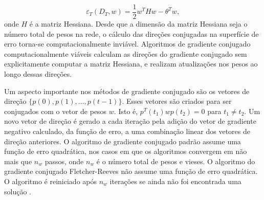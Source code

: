 \begin{equation}
\label{eq:scg1}
\varepsilon_T(D_T,w) = \frac{1}{2}w^THw - \theta^Tw,
\end{equation}
onde $H$ é a matriz Hessiana. Desde que a dimensão da matriz Hessiana seja o número total de pesos na rede, o cálculo das direções conjugadas na superfície de erro torna-se computacionalmente inviável. Algoritmos de gradiente conjugado computacionalmente viáveis calculam as direções do gradiente conjugado sem explicitamente computar a matriz Hessiana, e realizam atualizações nos pesos ao longo dessas direções.

Um aspecto importante nos métodos de gradiente conjugado são os vetores de direção $\{p(0),p(1),...,p(t-1)\}$. Esses vetores são criados para ser conjugados com o vetor de pesos $w$. Isto é,  $p^T(t_1)wp(t_2) = 0$ para $ t_1 \neq t_2$. Um novo vetor de direção é gerado a cada iteração pela adição do vetor de gradiente negativo calculado, da função de erro, a uma combinação linear dos vetores de direção anteriores. O algoritmo de gradiente conjugado padrão assume uma função de erro quadrática, nos casos em que os algoritmos convergem em não mais que $n_w$ passos, onde $n_w$ é o número total de pesos e vieses. O algoritmo do gradiente conjugado Fletcher-Reeves não assume uma função de erro quadrática. O algoritmo é reiniciado após $n_w$ iterações se ainda não foi encontrada uma solução \cite{engelbrecht2007computational}.

